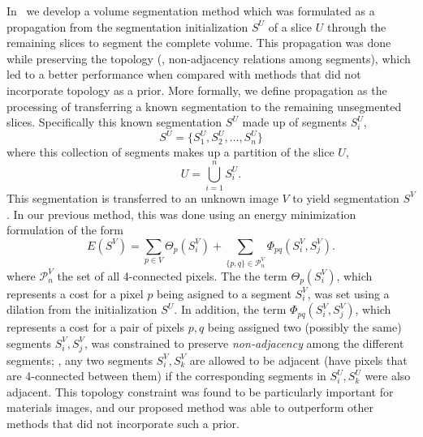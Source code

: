\documentclass[]{spie}  %
\begin{document}
In~\cite{waggoner:11} we develop a volume segmentation method which
was formulated as a propagation from the segmentation initialization
$S^U$ of a slice $U$ through the remaining slices to segment the
complete volume.  This propagation was done while preserving the
topology (\ie, non-adjacency relations among segments), which led to a
better performance when compared with methods that did not incorporate
topology as a prior.  More formally, we define propagation as the
processing of transferring a known segmentation to the remaining
unsegmented slices.  Specifically this known segmentation $S^U$ made
up of segments $S^U_i$,
\[S^U = \{ S^U_1, S^U_2, \ldots, S^U_n \} \]
where this collection of segments makes up a partition of the slice
$U$,
\[ U = \bigcup_{i=1}^{n}  S^U_i . \] 
This segmentation is transferred to an unknown image $V$ to yield
segmentation $S^V$.  In our previous method, this was done using an
energy minimization formulation of the form
\begin{equation}
  E( S^V ) = \sum_{p\in V}\Theta_p(S^V_i) + 
  \sum_{\{p,q\}\in\mathcal{P}^V_n} \Phi_{pq}(S_i^V , S_j^V) .
\label{eq:energy1}
\end{equation}
where $\mathcal{P}^V_n$ the set of all 4-connected pixels.  The the
\data{} term $\Theta_p(S^V_i)$, which represents a cost for a pixel
$p$ being asigned to a segment $S^V_i$, was set using a dilation from
the initialization $S^U$.  In addition, the \smooth{} term
$\Phi_{pq}(S_i^V , S_j^V)$, which represents a cost for a pair of
pixels $p,q$ being assigned two (possibly the same) segments $S^V_i,
S^V_j$, was constrained to preserve \emph{non-adjacency} among the
different segments; \ie, any two segments $S^V_i, S^V_k$ are allowed
to be adjacent (have pixels that are 4-connected between them) if the
corresponding segments in $S^U_i, S^U_k$ were also adjacent.  This
topology constraint was found to be particularly important for
materials images, and our proposed method was able to outperform other
methods that did not incorporate such a prior.
\end{document}
